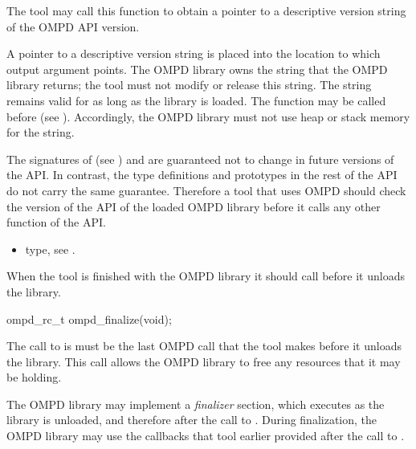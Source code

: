 \descr
The tool may call this function to obtain a pointer to a descriptive 
version string of the OMPD API  version.

\argdesc
A pointer to a descriptive version string is placed into the location
to which  output argument points. The OMPD library owns the string 
that the OMPD library returns; the tool must not modify or release this string.
The string remains valid for as long as the library is loaded. The
 function may be called before 
 (see ).
Accordingly, the OMPD library must not use heap or stack memory for the string.

The signatures of  (see
) and  
are guaranteed not to change in future versions of the API. In contrast, the 
type definitions and prototypes in the rest of the API do not carry the same 
guarantee. Therefore a tool that uses OMPD should check the version of the API 
of the loaded OMPD library before it calls any other function of the API.

\crossreferences
\begin{itemize}
\item {} type, see .
\end{itemize}



\label{subsubsubsec:ompd_finalize}

\summary
When the tool is finished with the OMPD library it should call 
 before it unloads the library.

\format
\begin{cspecific}
\begin{ompSyntax}
ompd_rc_t ompd_finalize(void);
\end{ompSyntax}
\end{cspecific}

\descr
The call to is must be the last OMPD call that the tool 
makes before it unloads the library. This call allows the OMPD library to
free any resources that it may be holding.

The OMPD library may implement a \emph{finalizer} section, which executes
as the library is unloaded, and therefore after the call to . 
During finalization, the OMPD library may use the callbacks that tool earlier 
provided after the call to .

